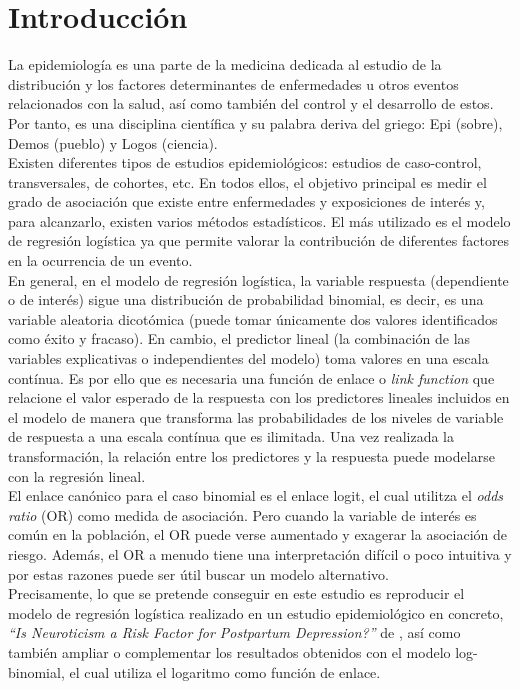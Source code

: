 \chapter{Introducción}
La epidemiología es una parte de la medicina dedicada al estudio de la distribución y los factores determinantes de enfermedades u otros eventos relacionados con la salud, así como también del control y el desarrollo de estos. Por tanto, es una disciplina científica y su palabra deriva del griego: Epi (sobre), Demos (pueblo) y Logos (ciencia). \\

Existen diferentes tipos de estudios epidemiológicos: estudios de caso-control, transversales, de cohortes, etc. En todos ellos, el objetivo principal es medir el grado de asociación que existe entre enfermedades y exposiciones de interés y, para alcanzarlo, existen varios métodos estadísticos. El más utilizado es el modelo de regresión logística ya que permite valorar la contribución de diferentes factores en la ocurrencia de un evento. \\

En general, en el modelo de regresión logística, la variable respuesta (dependiente o de interés) sigue una distribución de probabilidad binomial, es decir, es una variable aleatoria dicotómica (puede tomar únicamente dos valores identificados como éxito y fracaso). En cambio, el predictor lineal (la combinación de las variables explicativas o independientes del modelo)  toma valores en una escala contínua. Es por ello que es necesaria una función de enlace o \textit{link function} que relacione el valor esperado de la respuesta con los predictores lineales incluidos en el modelo de manera que transforma las probabilidades de los niveles de variable de respuesta a una escala contínua que es ilimitada. Una vez realizada la transformación, la relación entre los predictores y la respuesta puede modelarse con la regresión lineal. \\

El enlace canónico para el caso binomial es el enlace logit, el cual utilitza el \textit{odds ratio} (OR) como medida de asociación. Pero cuando la variable de interés es común en la población, el OR puede verse aumentado y exagerar la asociación de riesgo. Además, el OR a menudo tiene una interpretación difícil o poco intuitiva y por estas razones puede ser útil buscar un modelo alternativo.\\

Precisamente, lo que se pretende conseguir en este estudio es reproducir el modelo de regresión logística realizado en un estudio epidemiológico en concreto, \textit{``Is Neuroticism a Risk Factor for Postpartum Depression?''} de \textcite{Estudioppal}, así como también ampliar o complementar los resultados obtenidos con el modelo log-binomial, el cual utiliza el logaritmo como función de enlace.


